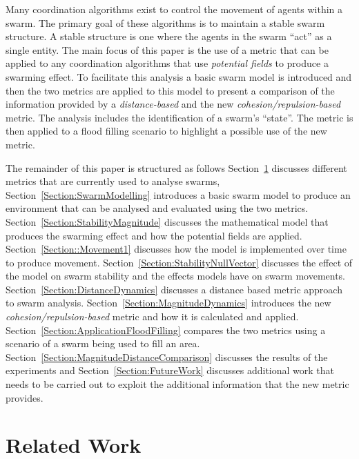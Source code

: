 \documentclass{ieeeaccess}
\begin{document}
Many coordination algorithms exist to control the movement of agents within a swarm. The primary goal of these algorithms is to maintain a stable swarm structure. A stable structure is one where the agents in the swarm ``act'' as a single entity. The main focus of this paper is the use of a metric that can be applied to any coordination algorithms that use \textit{potential fields} to produce a swarming effect. To facilitate this analysis a basic swarm model is introduced and then the two metrics are applied to this model to present a comparison of the information provided by a \textit{distance-based} and the new \textit{cohesion/repulsion-based} metric. The analysis includes the identification of a swarm's ``state''. The metric is then applied to a flood filling scenario to highlight a possible use of the new metric. 

The remainder of this paper is structured as follows Section~\ref{Section:Related} discusses different metrics that are currently used to analyse swarms, Section~\ref{Section:SwarmModelling} introduces a basic swarm model to produce an environment that can be analysed and evaluated using the two metrics. 
Section~\ref{Section:StabilityMagnitude} discusses the mathematical model that produces the swarming effect and how the potential fields are applied. 
Section~\ref{Section::Movement1} discusses how the model is implemented over time to produce movement. Section~\ref{Section:StabilityNullVector} discusses the effect of the model on swarm stability and the effects models have on swarm movements. 
Section~\ref{Section:DistanceDynamics} discusses a distance based metric approach to swarm analysis. Section~\ref{Section:MagnitudeDynamics} introduces the new \textit{cohesion/repulsion-based} metric and how it is calculated and applied. Section~\ref{Section:ApplicationFloodFilling} compares the two metrics using a scenario of a swarm being used to fill an area. Section~\ref{Section:MagnitudeDistanceComparison} discusses the results of the experiments and Section~\ref{Section:FutureWork} discusses additional work that needs to be carried out to exploit the additional information that the new metric provides.

\section{Related Work}\label{Section:Related}
\end{document}
